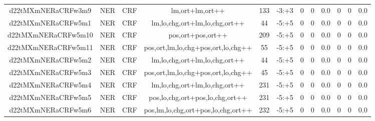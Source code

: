 \documentclass[a4paper]{article}
\begin{document}
\begin{landscape}
\begin{center}
\begin{tabular}{ |c|c|c|c|c|c|c|c|c|c|c|c|}
 	

 
 	
 	\small{ d22tMXmNERaCRFw3m9 } & \small{ NER} & \small{  CRF }  & lm,ort+lm,ort++  &  133 &  \small{  -3:+3 }  &  0 & 0 & 0.0  &  0 & 0 & 0.0 \\
 	

 
 	
 	\small{ d22tMXmNERaCRFw5m1 } & \small{ NER} & \small{  CRF }  & lm,lo,chg,ort+lm,lo,chg,ort++  &  44 &  \small{  -5:+5 }  &  0 & 0 & 0.0  &  0 & 0 & 0.0 \\
 	

 
 	
 	\small{ d22tMXmNERaCRFw5m10 } & \small{ NER} & \small{  CRF }  & pos,ort+pos,ort++  &  209 &  \small{  -5:+5 }  &  0 & 0 & 0.0  &  0 & 0 & 0.0 \\
 	

 
 	
 	\small{ d22tMXmNERaCRFw5m11 } & \small{ NER} & \small{  CRF }  & pos,ort,lm,lo,chg+pos,ort,lo,chg++  &  55 &  \small{  -5:+5 }  &  0 & 0 & 0.0  &  0 & 0 & 0.0 \\
 	

 
 	
 	\small{ d22tMXmNERaCRFw5m2 } & \small{ NER} & \small{  CRF }  & lm,lo,chg,ort+lm,lo,chg,ort++  &  44 &  \small{  -5:+5 }  &  0 & 0 & 0.0  &  0 & 0 & 0.0 \\
 	

 
 	
 	\small{ d22tMXmNERaCRFw5m3 } & \small{ NER} & \small{  CRF }  & pos,ort,lm,lo,chg+pos,ort,lo,chg++  &  45 &  \small{  -5:+5 }  &  0 & 0 & 0.0  &  0 & 0 & 0.0 \\
 	

 
 	
 	\small{ d22tMXmNERaCRFw5m4 } & \small{ NER} & \small{  CRF }  & lm,lo,chg,ort+lm,lo,chg,ort++  &  231 &  \small{  -5:+5 }  &  0 & 0 & 0.0  &  0 & 0 & 0.0 \\
 	

 
 	
 	\small{ d22tMXmNERaCRFw5m5 } & \small{ NER} & \small{  CRF }  & pos,lo,chg,ort+pos,lo,chg,ort++  &  231 &  \small{  -5:+5 }  &  0 & 0 & 0.0  &  0 & 0 & 0.0 \\
 	

 
 	
 	\small{ d22tMXmNERaCRFw5m6 } & \small{ NER} & \small{  CRF }  & pos,lm,lo,chg,ort+pos,lo,chg,ort++  &  232 &  \small{  -5:+5 }  &  0 & 0 & 0.0  &  0 & 0 & 0.0 \\
 	


\end{tabular}
\end{center}
\end{landscape}
\end{document}
